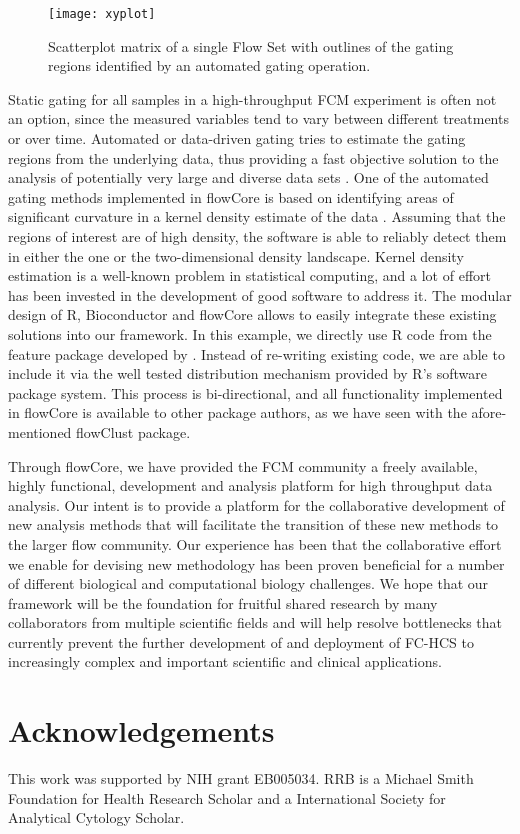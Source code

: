 \documentclass[12pt]{article}
\begin{document}
\begin{figure}[htbp]
\centering
\texttt{[image: xyplot]}
\caption{\label{xyplot}%
Scatterplot matrix of a single Flow Set with outlines of the gating
regions identified by an automated gating operation.}
\end{figure}

Static gating for all samples in a high-throughput FCM experiment is
often not an option, since the measured variables tend to vary between
different treatments or over time. Automated or data-driven gating
tries to estimate the gating regions from the underlying data, thus
providing a fast objective solution to the analysis of potentially
very large and diverse data sets \cite{lo2008agf}. One of the
automated gating methods implemented in flowCore is based on
identifying areas of significant curvature in a kernel density
estimate of the data \citep{wand2008}. Assuming that the regions of
interest are of high density, the software is able to reliably detect
them in either the one or the two-dimensional density
landscape. Kernel density estimation is a well-known problem in
statistical computing, and a lot of effort has been invested in the
development of good software to address it. The modular design of R,
Bioconductor and flowCore allows to easily integrate these existing
solutions into our framework. In this example, we directly use R code
from the feature package developed by \cite{wand2008}. Instead of
re-writing existing code, we are able to include it via the well
tested distribution mechanism provided by R's software package
system. This process is bi-directional, and all functionality
implemented in flowCore is available to other package authors, as we
have seen with the afore-mentioned flowClust package.


Through flowCore, we have provided the FCM community a freely
available, highly functional, development and analysis platform for high
throughput data analysis. Our intent is to provide a platform
for the collaborative development of new analysis methods that
will facilitate the transition of these new methods to the larger 
flow community. Our experience has been that the 
collaborative effort we enable for devising new methodology has been proven
beneficial for a number of different biological and computational biology challenges. 
We hope that our
framework will be the foundation for fruitful shared research by many
collaborators from multiple scientific fields and will help resolve
bottlenecks that currently prevent the further development of and deployment of
FC-HCS to increasingly complex and important scientific and clinical 
applications. 

\section*{Acknowledgements}
This work was supported by NIH grant EB005034. RRB is a Michael Smith
Foundation for Health Research Scholar and a International Society for
Analytical Cytology Scholar.

  
 
\end{document}
